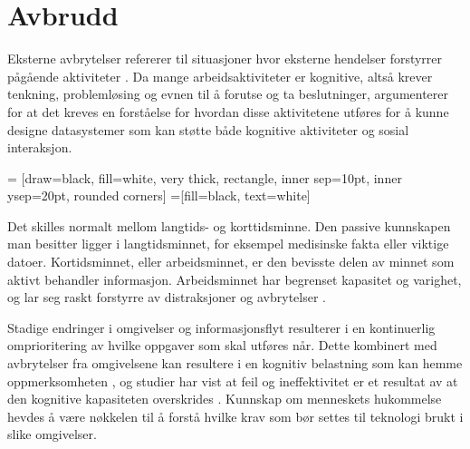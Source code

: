 \section{Avbrudd}
\label{sec:avbrudd}
Eksterne avbrytelser refererer til situasjoner hvor eksterne hendelser forstyrrer pågående aktiviteter \citep{Harr07}. Da mange arbeidsaktiviteter er kognitive, altså krever tenkning, problemløsing og evnen til å forutse og ta beslutninger, argumenterer \citet{Rogers94} for at det kreves en forståelse for hvordan disse aktivitetene utføres for å kunne designe datasystemer som kan støtte både kognitive aktiviteter og sosial interaksjon.

 = [draw=black, fill=white, very thick,
    rectangle, inner sep=10pt, inner ysep=20pt, rounded corners]
 =[fill=black, text=white]
%

\noindent
Det skilles normalt mellom langtids- og korttidsminne. Den passive kunnskapen man besitter ligger i langtidsminnet, for eksempel medisinske fakta eller viktige datoer. Kortidsminnet, eller arbeidsminnet, er den bevisste delen av minnet som aktivt behandler informasjon. Arbeidsminnet har begrenset kapasitet og varighet, og lar seg raskt forstyrre av distraksjoner og avbrytelser \citep{Parker00}. 

\noindent
Stadige endringer i omgivelser og informasjonsflyt resulterer i en kontinuerlig omprioritering av hvilke oppgaver som skal utføres når. Dette kombinert med avbrytelser fra omgivelsene kan resultere i en kognitiv belastning som kan hemme oppmerksomheten \citep{Ebright10}, og studier har vist at feil og ineffektivitet er et resultat av at den kognitive kapasiteten overskrides \citep{Parker00}. Kunnskap om menneskets hukommelse hevdes å være nøkkelen til å forstå hvilke krav som bør settes til teknologi brukt i slike omgivelser.

